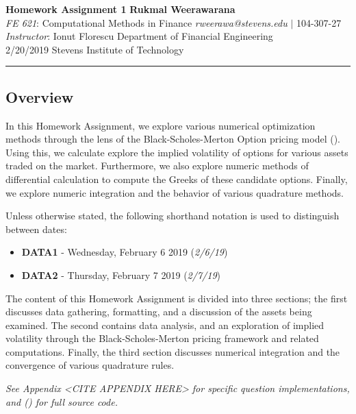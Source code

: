 \documentclass[10pt]{article}
\begin{document}
\thispagestyle{plain}


\noindent
\large\textbf{Homework Assignment 1} \hfill \textbf{Rukmal Weerawarana} \\
\normalsize \textit{FE 621}: Computational Methods in Finance \hfill \textit{rweerawa@stevens.edu} $\mid$ 104-307-27 \\
\textit{Instructor}: Ionut Florescu \hfill Department of Financial Engineering \\
2/20/2019 \hfill Stevens Institute of Technology

\noindent\rule{\linewidth}{.1em}



\subsection*{Overview}

In this Homework Assignment, we explore various numerical optimization methods through the lens of the Black-Scholes-Merton Option pricing model (\cite{Shreve2004}). Using this, we calculate explore the implied volatility of options for various assets traded on the market. Furthermore, we also explore numeric methods of differential calculation to compute the Greeks of these candidate options. Finally, we explore numeric integration and the behavior of various quadrature methods.

Unless otherwise stated, the following shorthand notation is used to distinguish between dates:

\begin{itemize}
    \item \textbf{DATA1} - Wednesday, February 6 2019 (\textit{2/6/19})
    \item \textbf{DATA2} - Thursday, February 7 2019 (\textit{2/7/19})
\end{itemize}

The content of this Homework Assignment is divided into three sections; the first discusses data gathering, formatting, and a discussion of the assets being examined. The second contains data analysis, and an exploration of implied volatility through the Black-Scholes-Merton pricing framework and related computations. Finally, the third section discusses numerical integration and the convergence of various quadrature rules.

\begin{center}
    \textit{See Appendix <CITE APPENDIX HERE> for specific question implementations, and (\cite{Weerawarana2019}) for full source code.}
\end{center}



\newpage

\printbibliography
\end{document}
